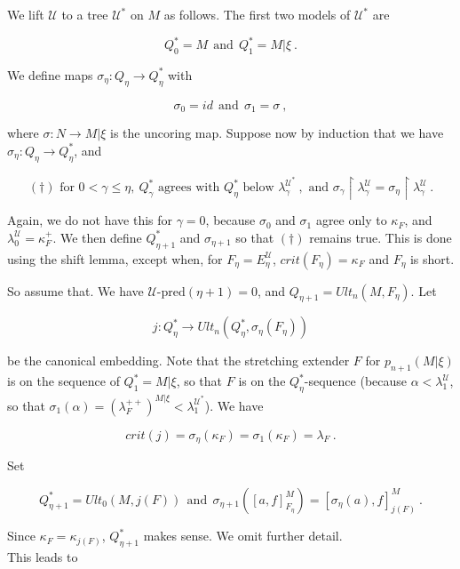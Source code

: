 \documentclass[12pt]{article}
\begin{document}
We lift $\mathscr{U}$ to a tree $\mathscr{U}^*$ on $M$ as follows.  The first two models of $\mathscr{U}^*$ are

\[
Q_0^* = M \ \ \text{and} \ \ Q_1^* = M | \xi \ .
\]

We define maps $\sigma_\eta : Q_\eta \longrightarrow Q_\eta^*$ with

\[
\sigma_0 = id \ \ \text{and} \ \ \sigma_1 = \sigma \ ,
\]

where $\sigma: N \longrightarrow M | \xi$ is the uncoring map.  Suppose now by induction that we have $\sigma_\eta : Q_\eta \longrightarrow Q_\eta^*$, and

\[
( \dagger ) \text{  for } 0 < \gamma \leq \eta , \ Q_\gamma^* \text{ agrees with } Q_\eta^* \text{ below } \lambda_\gamma^{\mathscr{U}^*} \ , \text{ and } \sigma_\gamma \restriction \lambda_\gamma^{\mathscr{U}} = \sigma_\eta \restriction \lambda_\gamma^{\mathscr{U}} \ .
\]

Again, we do not have this for $\gamma = 0$, because $\sigma_0$ and $\sigma_1$ agree only to $\kappa_F$, and $\lambda_0^{\mathscr{U}} = \kappa_F^+$.  We then define $Q_{\eta + 1}^*$ and $\sigma_{\eta + 1}$ so that $( \dagger )$ remains true.  This is done using the shift lemma, except when, for $F_\eta = E_\eta^{\mathscr{U}}$, $crit(F_\eta) = \kappa_F$ and $F_\eta$ is short.

So assume that.  We have $\mathscr{U} \text{-pred} (\eta + 1) = 0$, and $Q_{\eta + 1} = Ult_n (M, F_\eta)$.  Let

\[
j: Q_\eta^* \longrightarrow Ult_n (Q_\eta^* , \sigma_\eta (F_\eta ))
\]

be the canonical embedding.  Note that the stretching extender $F$ for $p_{n+1} (M | \xi)$ is on the sequence of $Q_1^* = M | \xi$, so that $F$ is on the $Q_\eta^*$-sequence (because $\alpha < \lambda_1^{\mathscr{U}}$, so that $\sigma_1 (\alpha) = (\lambda_F^{++})^{M | \xi} < \lambda_1^{\mathscr{U}^*}$).  We have

\[
crit(j) = \sigma_\eta (\kappa_F) = \sigma_1 (\kappa_F) = \lambda_F \ .
\]

Set

\[
Q_{\eta + 1}^* = Ult_0 (M, j(F)) \ \ \text{and} \ \ \sigma_{\eta + 1} ( [ a, f]_{F_\eta}^M ) = [ \sigma_\eta (a), f ]_{j(F)}^M \ .
\]

Since $\kappa_F = \kappa_{j(F)}$, $Q_{\eta + 1}^*$ makes sense.  We omit further detail.\\

This leads to\\
\end{document}
